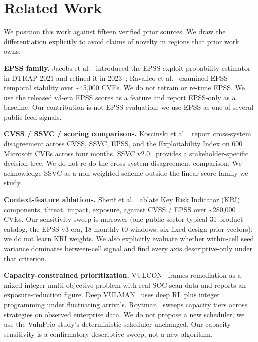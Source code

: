 \section{Related Work}
We position this work against fifteen verified prior sources. We draw the differentiation explicitly to avoid claims of novelty in regions that prior work owns.

\textbf{EPSS family.} Jacobs et al.~\cite{Jacobs2021EPSS} introduced the EPSS exploit-probability estimator in DTRAP 2021 and refined it in 2023~\cite{Jacobs2023EnhancingEPSS}; Ravalico et al.~\cite{Ravalico2025EPSSDynamics} examined EPSS temporal stability over \textasciitilde{}45,000 CVEs. We do not retrain or re-tune EPSS. We use the released v3-era EPSS scores as a feature and report EPSS-only as a baseline. Our contribution is not EPSS evaluation; we use EPSS as one of several public-feed signals.

\textbf{CVSS / SSVC / scoring comparisons.} Koscinski et al.~\cite{Koscinski2025ConflictingScores} report cross-system disagreement across CVSS, SSVC, EPSS, and the Exploitability Index on 600 Microsoft CVEs across four months. SSVC v2.0~\cite{CISA2023SSVCv2} provides a stakeholder-specific decision tree. We do not re-do the cross-system disagreement comparison. We acknowledge SSVC as a non-weighted scheme outside the linear-score family we study.

\textbf{Context-feature ablations.} Sherif et al.~\cite{Sherif2026KRI} ablate Key Risk Indicator (KRI) components, threat, impact, exposure, against CVSS / EPSS over \textasciitilde{}280,000 CVEs. Our sensitivity sweep is narrower (one public-sector-typical 31-product catalog, the EPSS v3 era, 18 monthly t0 windows, six fixed design-prior vectors); we do not learn KRI weights. We also explicitly evaluate whether within-cell seed variance dominates between-cell signal and find every axis descriptive-only under that criterion.

\textbf{Capacity-constrained prioritization.} VULCON~\cite{Farris2018VULCON} frames remediation as a mixed-integer multi-objective problem with real SOC scan data and reports an exposure-reduction figure. Deep VULMAN~\cite{Hore2023DeepVulman} uses deep RL plus integer programming under fluctuating arrivals. Roytman~\cite{Roytman2024CapacityIsKing} sweeps capacity tiers across strategies on observed enterprise data. We do not propose a new scheduler; we use the VulnPrio study's deterministic scheduler unchanged. Our capacity sensitivity is a confirmatory descriptive sweep, not a new algorithm.

